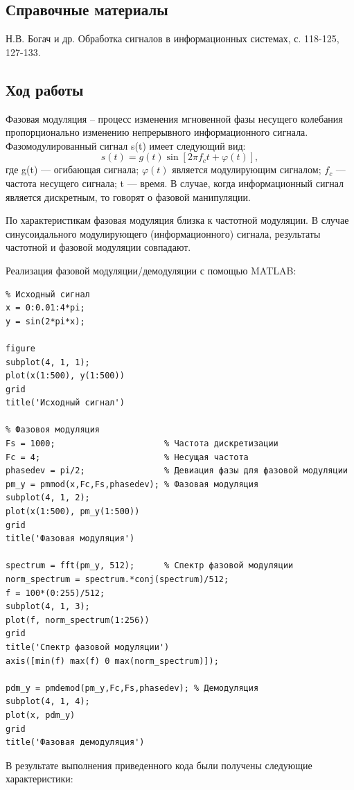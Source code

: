 \documentclass[10pt,a4paper]{article}
\begin{document}
\subsection{Справочные материалы}
Н.В. Богач и др. Обработка сигналов в информационных системах, с. 118-125, 127-133.

\subsection{Ход работы}
Фазовая модуляция – процесс изменения мгновенной фазы несущего колебания пропорционально изменению непрерывного информационного сигнала. Фазомодулированный сигнал s(t) имеет следующий вид:
	\begin{equation}
	s(t) = g(t) \sin[2 \pi f_c t + \varphi(t)],
	\end{equation}
где g(t) — огибающая сигнала; $\varphi(t)$ является модулирующим сигналом; $f_c$ — частота несущего сигнала; t — время.
В случае, когда информационный сигнал является дискретным, то говорят о фазовой манипуляции.

По характеристикам фазовая модуляция близка к частотной модуляции. В случае синусоидального модулирующего (информационного) сигнала, результаты частотной и фазовой модуляции совпадают.

Реализация фазовой модуляции/демодуляции с помощью MATLAB:
\begin{verbatim}
% Исходный сигнал
x = 0:0.01:4*pi;
y = sin(2*pi*x);

figure
subplot(4, 1, 1);
plot(x(1:500), y(1:500))
grid
title('Исходный сигнал')
 
% Фазовоя модуляция
Fs = 1000;                      % Частота дискретизации 
Fc = 4;                         % Несущая частота 
phasedev = pi/2;                % Девиация фазы для фазовой модуляции
pm_y = pmmod(x,Fc,Fs,phasedev); % Фазовая модуляция
subplot(4, 1, 2);
plot(x(1:500), pm_y(1:500))
grid
title('Фазовая модуляция')

spectrum = fft(pm_y, 512);      % Спектр фазовой модуляции
norm_spectrum = spectrum.*conj(spectrum)/512;  
f = 100*(0:255)/512;
subplot(4, 1, 3);
plot(f, norm_spectrum(1:256))
grid
title('Спектр фазовой модуляции')
axis([min(f) max(f) 0 max(norm_spectrum)]);

pdm_y = pmdemod(pm_y,Fc,Fs,phasedev); % Демодуляция
subplot(4, 1, 4);
plot(x, pdm_y)
grid
title('Фазовая демодуляция')
\end{verbatim}


В результате выполнения приведенного кода были получены следующие характеристики:
\end{document}
